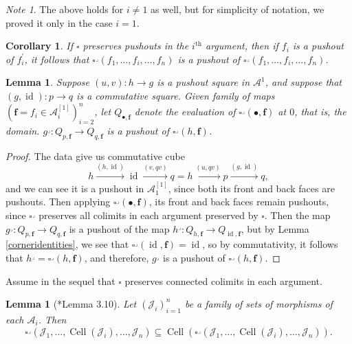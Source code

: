 \documentclass{amsart}
\numberwithin{equation}{section}
\theoremstyle{plain}   %
\newtheorem{cor}[subsection]{Corollary}
\newtheorem{lemma}[subsection]{Lemma}
\theoremstyle{remark}
\newtheorem{note}[subsection]{Note}
\theoremstyle{plain}
\DeclareMathOperator{\id}{id}
\begin{document}
\begin{note}
	The above holds for \(i\neq 1\) as well, but for simplicity of notation, we proved it only in the case \(i=1\).  
\end{note}
\begin{cor}\label{cornerpushouts}
	If \(\square\) preserves pushouts in the \(i^{\mathrm{th}}\) argument, then if \(f_i\) is a pushout of \(f_i^\prime\), it follows that \(\square^\lrcorner(f_1,\dots,f_i,\dots,f_n)\) is a pushout of \(\square^\lrcorner(f_1,\dots,f_i,\dots,f_n)\).
\end{cor}
\begin{lemma}
	Suppose \((u,v):h\to g\) is a pushout square in \(\mathcal{A}^1\), and suppose that \((g,\id):p\to q\) is a commutative square.  Given family of maps \((\mathbf{f}=f_i \in \mathcal{A}_i^{[1]})_{i=2}^n\), let \(Q_{\bullet,\mathbf{f}}\) denote the evaluation of \(\square^\lrcorner(\bullet,\mathbf{f})\) at \(0\), that is, the domain.  \(g^\lrcorner: Q_{p,\mathbf{f}} \to Q_{q,\mathbf{f}}\) is a pushout of \(\square^\lrcorner(h,\mathbf{f})\).  
\end{lemma}
\begin{proof} The data give us commutative cube 
	\[h \xrightarrow{(h,\id)} \id \xrightarrow{(v,qv)} q = h \xrightarrow{(u,qv)} p \xrightarrow{(g,\id)} q,\]
	and we can see it is a pushout in \(\mathcal{A}_1^{[1]}\), since both its front and back faces are pushouts.  Then applying \(\square^\lrcorner(\bullet,\mathbf{f})\), its front and back faces remain pushouts, since \(\square^\lrcorner\) preserves all colimits in each argument preserved by \(\square\).  Then the map \(g^\lrcorner: Q_{p,\mathbf{f}} \to Q_{q,\mathbf{f}}\)  is a pushout of the map \(h^\lrcorner:Q_{h,\mathbf{f}} \to Q_{\id,\mathbf{f}}\), but by Lemma \ref{corneridentities}, we see that \(\square^\lrcorner(\id,\mathbf{f})=\id\), so by commutativity, it follows that \(h^\lrcorner = \square^\lrcorner(h,\mathbf{f})\), and therefore, \(g^\lrcorner\) is a pushout of \(\square^\lrcorner(h,\mathbf{f})\).  
\end{proof}
Assume in the sequel that \(\square\) preserves connected colimits in each argument.
\begin{lemma}[\cite{oury}*{Lemma 3.10}]\label{cornertensorcell}
	Let \((\mathscr{J}_i)_{i=1}^n\) be a family of sets of morphisms of each \(\mathcal{A}_i\). Then 
	\[\square^\lrcorner(\mathscr{J}_1,\dots,\operatorname{Cell}(\mathscr{J}_i),\dots,\mathscr{J}_n) \subseteq \operatorname{Cell}(\square^\lrcorner(\mathscr{J}_1,\dots,\operatorname{Cell}(\mathscr{J}_i),\dots,\mathscr{J}_n)).\]
\end{lemma}
\end{document}

